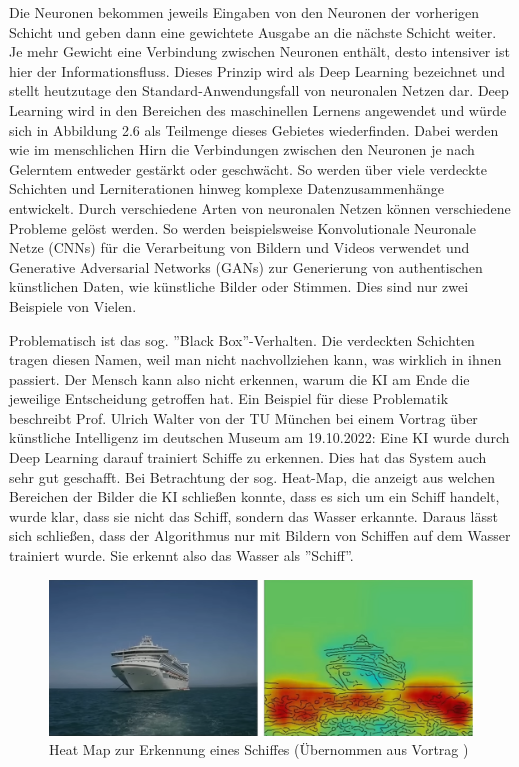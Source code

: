 \documentclass[a4paper,12pt, german]{report}
\begin{document}
Die Neuronen bekommen jeweils Eingaben von den Neuronen der vorherigen Schicht und geben dann eine gewichtete Ausgabe an die nächste Schicht weiter. Je mehr Gewicht eine Verbindung zwischen Neuronen enthält, desto intensiver ist hier der Informationsfluss. Dieses Prinzip wird als Deep Learning bezeichnet und stellt heutzutage den Standard-Anwendungsfall von neuronalen Netzen dar. Deep Learning wird in den Bereichen des maschinellen Lernens angewendet und würde sich in Abbildung 2.6 als Teilmenge dieses Gebietes wiederfinden. Dabei werden wie im menschlichen Hirn die Verbindungen zwischen den Neuronen je nach Gelerntem entweder gestärkt oder geschwächt. So werden über viele verdeckte Schichten und Lerniterationen hinweg komplexe Datenzusammenhänge entwickelt.\newline
Durch verschiedene Arten von neuronalen Netzen können verschiedene Probleme gelöst werden. So werden beispielsweise Konvolutionale Neuronale Netze (CNNs) für die Verarbeitung von Bildern und Videos verwendet und Generative Adversarial Networks (GANs) zur Generierung von authentischen künstlichen Daten, wie künstliche Bilder oder Stimmen. Dies sind nur zwei Beispiele von Vielen.\cite{17} 

Problematisch ist das sog. ''Black Box''-Verhalten. Die verdeckten Schichten tragen diesen Namen, weil man nicht nachvollziehen kann, was wirklich in ihnen passiert. Der Mensch kann also nicht erkennen, warum die KI am Ende die jeweilige Entscheidung getroffen hat. Ein Beispiel für diese Problematik beschreibt Prof. Ulrich Walter von der TU München bei einem Vortrag über künstliche Intelligenz im deutschen Museum am 19.10.2022: Eine KI wurde durch Deep Learning darauf trainiert Schiffe zu erkennen. Dies hat das System auch sehr gut geschafft. Bei Betrachtung der sog. Heat-Map, die anzeigt aus welchen Bereichen der Bilder die KI schließen konnte, dass es sich um ein Schiff handelt, wurde klar, dass sie nicht das Schiff, sondern das Wasser erkannte. Daraus lässt sich schließen, dass der Algorithmus nur mit Bildern von Schiffen auf dem Wasser trainiert wurde. Sie erkennt also das Wasser als ''Schiff''.\cite{16}

\begin{figure}[H]
  \center
 \includegraphics[width=14cm]{images/Schiff-HeatMap.png}
  \caption[Heat Map zur Erkennung eines Schiffes]{Heat Map zur Erkennung eines Schiffes (Übernommen aus Vortrag \cite{16})}
\end{figure}
\end{document}
